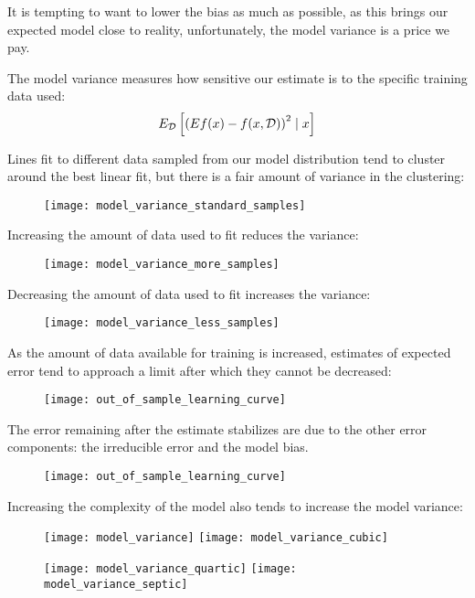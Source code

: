 %
%
\begin{frame}
  It is tempting to want to lower the bias as much as possible, as this brings
  our expected model close to reality, unfortunately, the model variance is a
  price we pay.
\end{frame}
%
%
\begin{frame}
  The model variance measures how sensitive our estimate is to the specific
  training data used:
      $$ E_{\operatorname*{\mathcal{D}}} \left[ \left( Ef(x) - f(x,\operatorname*{\mathcal{D}}) \right)^2 \mid x \right] $$
\end{frame}
%
%
\begin{frame}
   Lines fit to different data sampled from our model distribution tend to
   cluster around the best linear fit, but there is a fair amount of variance in
   the clustering:
  \begin{figure}
    \texttt{[image: model\_variance\_standard\_samples]}
  \end{figure}
\end{frame}
%
%
\begin{frame}
  Increasing the amount of data used to fit reduces the variance:
  \begin{figure}
    \texttt{[image: model\_variance\_more\_samples]}
  \end{figure}
\end{frame}
%
%
\begin{frame}
  Decreasing the amount of data used to fit increases the variance:
  \begin{figure}
    \texttt{[image: model\_variance\_less\_samples]}
  \end{figure}
\end{frame}
%
%
\begin{frame}
  As the amount of data available for training is increased, estimates of
  expected error tend to approach a limit after which they cannot be decreased:
  \begin{figure}
    \texttt{[image: out\_of\_sample\_learning\_curve]}
  \end{figure}
\end{frame}
%
%
\begin{frame}
  The error remaining after the estimate stabilizes are due to the other error
  components: the irreducible error and the model bias.
  \begin{figure}
    \texttt{[image: out\_of\_sample\_learning\_curve]}
  \end{figure}
\end{frame}
%
%
\begin{frame}
  Increasing the complexity of the model also tends to increase the model
  variance:
  \begin{figure}
      \texttt{[image: model\_variance]}
      \texttt{[image: model\_variance\_cubic]}
  \end{figure}
  \begin{figure}
      \texttt{[image: model\_variance\_quartic]}
      \texttt{[image: model\_variance\_septic]}
  \end{figure}
\end{frame}
